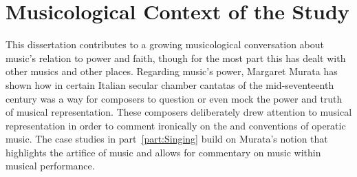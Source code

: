 





\section{%
Musicological Context of the Study
}

This dissertation contributes to a growing musicological conversation about music's relation to power and faith, though for the most part this has dealt with other musics and other places.
Regarding music's power, Margaret Murata has shown how  in certain Italian secular chamber cantatas of the mid-seventeenth century was a way for composers to question or even mock the power and truth of musical representation.%
	\autocite{Murata:Singing}
These composers deliberately drew attention to musical representation in order to comment ironically on the  and conventions of operatic music.
The case studies in part~\ref{part:Singing} build on Murata's notion that  highlights the artifice of music and allows for commentary on music within musical performance.

